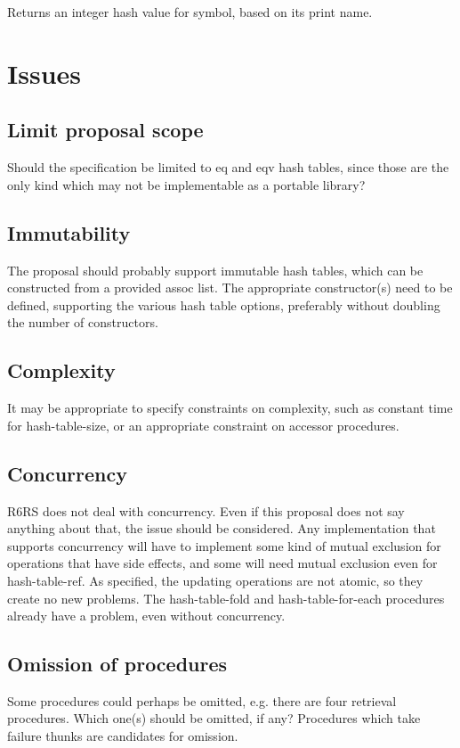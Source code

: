 \documentclass[twoside,twocolumn]{algol60}
\begin{document}
\begin{entry}{}
Returns an integer hash value for symbol, based on its print name.
\end{entry}

\section{Issues}

\subsection{Limit proposal scope}
Should the specification be limited to eq and eqv hash tables, since those are the only kind which may not be implementable as a portable library?

\subsection{Immutability}
The proposal should probably support immutable hash tables, which can be constructed from a provided assoc list.  The appropriate constructor(s) need to be defined, supporting the various hash table options, preferably without doubling the number of constructors.

\subsection{Complexity}
It may be appropriate to specify constraints on complexity, such as constant time for hash-table-size, or an appropriate constraint on accessor procedures.

\subsection{Concurrency}
R6RS does not deal with concurrency.  Even if this proposal does not say anything about that, the issue should be considered.  Any implementation that supports concurrency will have to implement some kind of mutual exclusion for operations that have side effects, and some will need mutual exclusion even for {\cf hash-table-ref}.  As specified, the updating operations are not atomic, so they create no new problems.  The {\cf hash-table-fold} and {\cf hash-table-for-each} procedures already have a problem, even without concurrency.

\subsection{Omission of procedures}
Some procedures could perhaps be omitted, e.g. there are four retrieval procedures.  Which one(s) should be omitted, if any?  Procedures which take failure thunks are candidates for omission.
\end{document}
